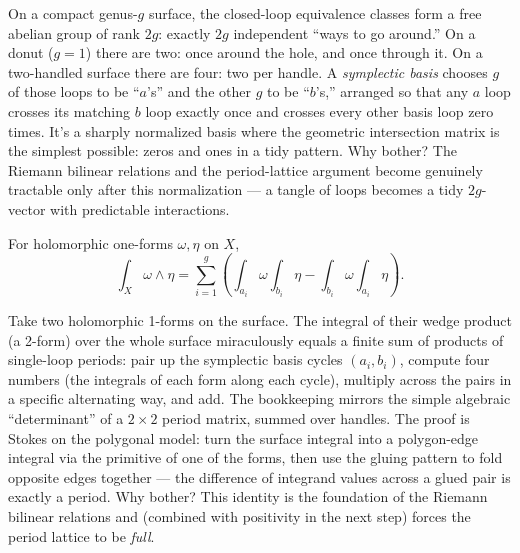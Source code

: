 \begin{layman}
On a compact genus-\(g\) surface, the closed-loop equivalence classes
form a free abelian group of rank \(2g\): exactly \(2g\) independent
``ways to go around.'' On a donut (\(g = 1\)) there are two: once
around the hole, and once through it. On a two-handled surface there
are four: two per handle. A \emph{symplectic basis} chooses \(g\) of
those loops to be ``\(a\)'s'' and the other \(g\) to be ``\(b\)'s,''
arranged so that any \(a\) loop crosses its matching \(b\) loop exactly
once and crosses every other basis loop zero times. It's a sharply
normalized basis where the geometric intersection matrix is the
simplest possible: zeros and ones in a tidy pattern. Why bother? The
Riemann bilinear relations and the period-lattice argument become
genuinely tractable only after this normalization — a tangle of loops
becomes a tidy \(2g\)-vector with predictable interactions.
\end{layman}

\begin{theorem}
\label{thm:bilinear-from-stokes}
For holomorphic one-forms \(\omega,\eta\) on \(X\),
\[
  \int_X \omega\wedge\eta
  =
  \sum_{i=1}^{g}
  \left(
    \int_{a_i}\omega\int_{b_i}\eta
    -
    \int_{b_i}\omega\int_{a_i}\eta
  \right).
\]
\notready
\end{theorem}

\begin{layman}
Take two holomorphic 1-forms on the surface. The integral of their
wedge product (a 2-form) over the whole surface miraculously equals a
finite sum of products of single-loop periods: pair up the symplectic
basis cycles \((a_i, b_i)\), compute four numbers (the integrals of
each form along each cycle), multiply across the pairs in a specific
alternating way, and add. The bookkeeping mirrors the simple algebraic
``determinant'' of a \(2 \times 2\) period matrix, summed over handles.
The proof is Stokes on the polygonal model: turn the surface integral
into a polygon-edge integral via the primitive of one of the forms,
then use the gluing pattern to fold opposite edges together — the
difference of integrand values across a glued pair is exactly a
period. Why bother? This identity is the foundation of the Riemann
bilinear relations and (combined with positivity in the next step)
forces the period lattice to be \emph{full}.
\end{layman}

